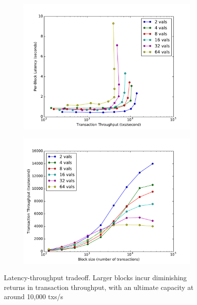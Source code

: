 \begin{figure}[]
	\centering
	\begin{subfigure}{0.8 \textwidth}
		\includegraphics[width=\linewidth,height=\textheight,keepaspectratio]{figures/throughput/latency-throughput.pdf}
	\end{subfigure}

	\begin{subfigure}{0.8 \textwidth}
		\includegraphics[width=\linewidth,height=\textheight,keepaspectratio]{figures/throughput/throughput-blocksize.pdf}
	\end{subfigure}
	\centering
	\caption[Latency-Throughput tradeoff in non-faulty global network]{Latency-throughput tradeoff.
Larger blocks incur diminishing 
returns in transaction throughput, with an ultimate capacity at around 10,000 txs/s}
	\label{fig:exp:throughput}
\end{figure}


